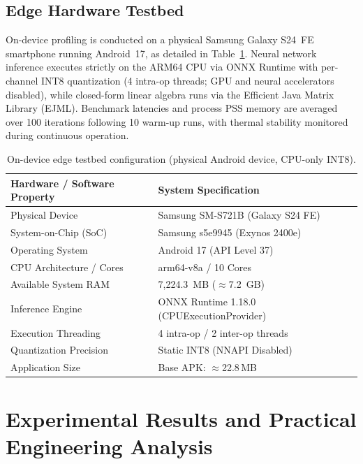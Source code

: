 \documentclass[preprint,12pt]{elsarticle}
\begin{document}
\subsection{Edge Hardware Testbed}
\label{sec:edge_hardware_testbed}
On-device profiling is conducted on a physical Samsung Galaxy S24~FE smartphone running Android~17, as detailed in Table~\ref{tab:device_spec}. Neural network inference executes strictly on the ARM64 CPU via ONNX Runtime with per-channel INT8 quantization (4 intra-op threads; GPU and neural accelerators disabled), while closed-form linear algebra runs via the Efficient Java Matrix Library (EJML). Benchmark latencies and process PSS memory are averaged over 100 iterations following 10 warm-up runs, with thermal stability monitored during continuous operation.

\begin{table}[htbp]
\caption{On-device edge testbed configuration (physical Android device, CPU-only INT8).}
\label{tab:device_spec}
\centering
\footnotesize
\begin{tabular}{ll}
\toprule
\textbf{Hardware / Software Property} & \textbf{System Specification} \\
\midrule
Physical Device & Samsung SM-S721B (Galaxy S24 FE) \\
System-on-Chip (SoC) & Samsung s5e9945 (Exynos 2400e) \\
Operating System & Android 17 (API Level 37) \\
CPU Architecture / Cores & arm64-v8a / 10 Cores \\
Available System RAM & 7,224.3~MB ($\approx$7.2~GB) \\
Inference Engine & ONNX Runtime 1.18.0 (CPUExecutionProvider) \\
Execution Threading & 4 intra-op / 2 inter-op threads \\
Quantization Precision & Static INT8 (NNAPI Disabled) \\
Application Size & Base APK: $\approx$22.8\,MB \\
\bottomrule
\end{tabular}
\end{table}


\section{Experimental Results and Practical Engineering Analysis}
\label{sec:results}
\end{document}
